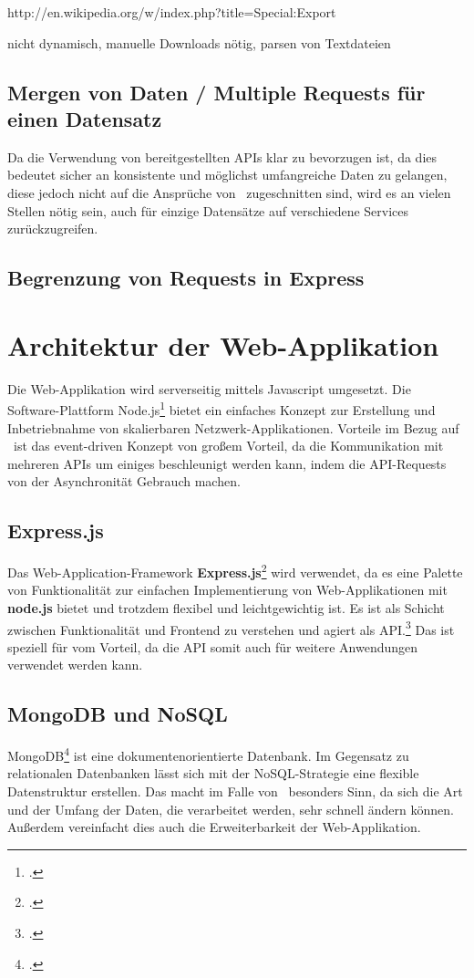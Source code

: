 http://en.wikipedia.org/w/index.php?title=Special:Export


nicht dynamisch, manuelle Downloads nötig, parsen von Textdateien

\subsection{Mergen von Daten / Multiple Requests für einen Datensatz}
Da die Verwendung von bereitgestellten APIs klar zu bevorzugen ist, da dies bedeutet sicher an konsistente und möglichst umfangreiche Daten zu gelangen, diese jedoch nicht auf die Ansprüche von \arbeitstitel \ zugeschnitten sind, wird es an vielen Stellen nötig sein, auch für einzige Datensätze auf verschiedene Services zurückzugreifen.

\subsection{Begrenzung von Requests in Express}



\section{Architektur der Web-Applikation}
Die Web-Applikation wird serverseitig mittels Javascript umgesetzt. Die Software-Plattform Node.js\footcite{nodejs} bietet ein einfaches Konzept zur Erstellung und Inbetriebnahme von skalierbaren Netzwerk-Applikationen. Vorteile im Bezug auf \arbeitstitel \ ist das event-driven Konzept von großem Vorteil, da die Kommunikation mit mehreren APIs um einiges beschleunigt werden kann, indem die API-Requests von der Asynchronität Gebrauch machen.

\subsection{Express.js}
Das Web-Application-Framework \textbf{Express.js}\footcite{expressjs} wird verwendet, da es eine Palette von Funktionalität zur einfachen Implementierung von Web-Applikationen mit \textbf{node.js} bietet und trotzdem flexibel und leichtgewichtig ist. Es ist als Schicht zwischen Funktionalität und Frontend zu verstehen und agiert als API.\footcite[Vgl.][]{expressjs} Das ist speziell für \arbeitstitel vom Vorteil, da die API somit auch für weitere Anwendungen verwendet werden kann.

\subsection{MongoDB und NoSQL}
MongoDB\footcite{mongodb} ist eine dokumentenorientierte Datenbank. Im Gegensatz zu relationalen Datenbanken lässt sich mit der NoSQL-Strategie eine flexible Datenstruktur erstellen. Das macht im Falle von \arbeitstitel \ besonders Sinn, da sich die Art und der Umfang der Daten, die verarbeitet werden, sehr schnell ändern können. Außerdem vereinfacht dies auch die Erweiterbarkeit der Web-Applikation.


